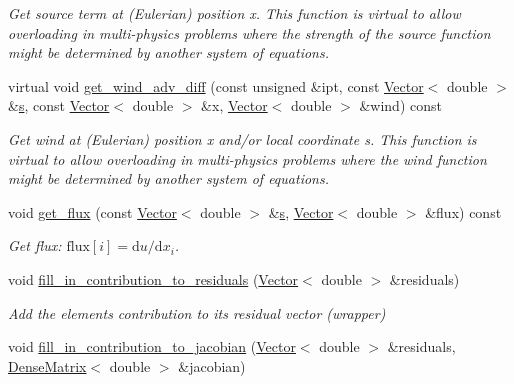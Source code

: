\begin{DoxyCompactItemize}
\begin{DoxyCompactList}\small\item\em Get source term at (Eulerian) position x. This function is virtual to allow overloading in multi-\/physics problems where the strength of the source function might be determined by another system of equations. \end{DoxyCompactList}\item 
virtual void \hyperlink{classoomph_1_1AdvectionDiffusionEquations_a32cb2f977b32fabfc23d1134749371ed}{get\+\_\+wind\+\_\+adv\+\_\+diff} (const unsigned \&ipt, const \hyperlink{classoomph_1_1Vector}{Vector}$<$ double $>$ \&\hyperlink{cfortran_8h_ab7123126e4885ef647dd9c6e3807a21c}{s}, const \hyperlink{classoomph_1_1Vector}{Vector}$<$ double $>$ \&x, \hyperlink{classoomph_1_1Vector}{Vector}$<$ double $>$ \&wind) const
\begin{DoxyCompactList}\small\item\em Get wind at (Eulerian) position x and/or local coordinate s. This function is virtual to allow overloading in multi-\/physics problems where the wind function might be determined by another system of equations. \end{DoxyCompactList}\item 
void \hyperlink{classoomph_1_1AdvectionDiffusionEquations_a9c0fdde918adc761bb6f212cd9625e64}{get\+\_\+flux} (const \hyperlink{classoomph_1_1Vector}{Vector}$<$ double $>$ \&\hyperlink{cfortran_8h_ab7123126e4885ef647dd9c6e3807a21c}{s}, \hyperlink{classoomph_1_1Vector}{Vector}$<$ double $>$ \&flux) const
\begin{DoxyCompactList}\small\item\em Get flux\+: $\mbox{flux}[i] = \mbox{d}u / \mbox{d}x_i $. \end{DoxyCompactList}\item 
void \hyperlink{classoomph_1_1AdvectionDiffusionEquations_ae56ee6b085c75be438a598244c527fb5}{fill\+\_\+in\+\_\+contribution\+\_\+to\+\_\+residuals} (\hyperlink{classoomph_1_1Vector}{Vector}$<$ double $>$ \&residuals)
\begin{DoxyCompactList}\small\item\em Add the element\textquotesingle{}s contribution to its residual vector (wrapper) \end{DoxyCompactList}\item 
void \hyperlink{classoomph_1_1AdvectionDiffusionEquations_a6ec1e0f92fa79998be9340ecfda4bcd5}{fill\+\_\+in\+\_\+contribution\+\_\+to\+\_\+jacobian} (\hyperlink{classoomph_1_1Vector}{Vector}$<$ double $>$ \&residuals, \hyperlink{classoomph_1_1DenseMatrix}{Dense\+Matrix}$<$ double $>$ \&jacobian)

\end{DoxyCompactItemize}
